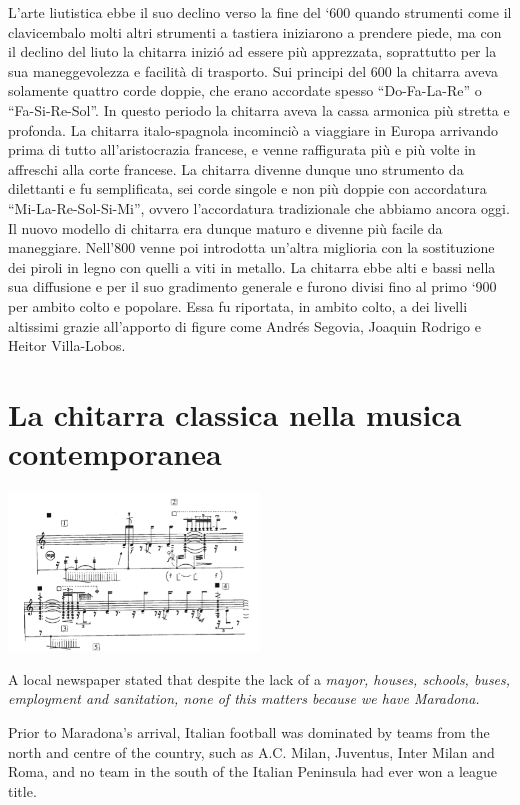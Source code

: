 \documentclass[oneside]{article}
\begin{document}
\begin{multicols*}{2}
L’arte liutistica ebbe il suo declino verso la fine del ‘600 quando strumenti come il clavicembalo molti altri strumenti a tastiera iniziarono a prendere piede, ma con il declino del liuto la  chitarra inizió ad essere più apprezzata, soprattutto per la sua maneggevolezza e facilità di trasporto.
Sui principi del 600 la chitarra aveva solamente quattro corde doppie, che erano accordate spesso  “Do-Fa-La-Re” o “Fa-Si-Re-Sol”. 
In questo periodo la chitarra aveva la cassa armonica più stretta e profonda.
La chitarra italo-spagnola incominciò a viaggiare in Europa arrivando prima di tutto all’aristocrazia francese, e venne raffigurata più e più volte in affreschi alla corte francese.
La chitarra divenne dunque uno strumento da dilettanti e fu semplificata, sei corde singole e non più doppie con accordatura “Mi-La-Re-Sol-Si-Mi”, ovvero l’accordatura tradizionale che abbiamo ancora oggi.
Il nuovo modello di chitarra era dunque maturo e divenne più facile da maneggiare. Nell’800 venne poi introdotta un’altra miglioria con la sostituzione dei piroli in legno con quelli a viti in metallo.
La chitarra ebbe alti e bassi nella sua diffusione e per il suo gradimento generale e furono divisi fino al  primo ‘900 per ambito colto e popolare.
Essa fu riportata, in ambito colto, a dei livelli altissimi grazie all’apporto di figure come Andrés Segovia, Joaquin Rodrigo e Heitor Villa-Lobos.



\section{La chitarra classica nella musica contemporanea}
\includegraphics[width=0.5\textwidth]{img/ektopos.png}


A local newspaper stated that despite the lack of a \emph{mayor, houses, schools, buses, employment and sanitation, none of this matters because we have Maradona.} 

Prior to Maradona's arrival, Italian football was dominated by teams from the north and centre of the country, such as A.C. Milan, Juventus, Inter Milan and Roma, and no team in the south of the Italian Peninsula had ever won a league title.


\end{multicols*}
\end{document}
